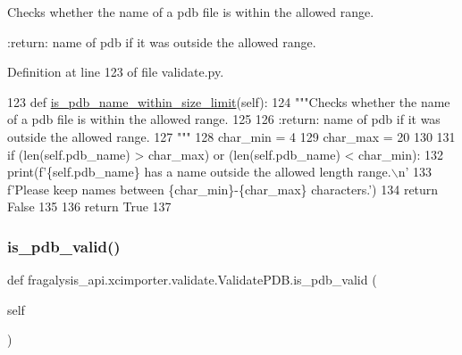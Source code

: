 \begin{DoxyVerb}Checks whether the name of a pdb file is within the allowed range.

:return: name of pdb if it was outside the allowed range.
\end{DoxyVerb}
 

Definition at line 123 of file validate.\+py.


\begin{DoxyCode}
123     \textcolor{keyword}{def }\hyperlink{classfragalysis__api_1_1xcimporter_1_1validate_1_1_validate_p_d_b_a23b89548ce5a6619636348c711b7b27e}{is\_pdb\_name\_within\_size\_limit}(self):
124         \textcolor{stringliteral}{"""Checks whether the name of a pdb file is within the allowed range.}
125 \textcolor{stringliteral}{}
126 \textcolor{stringliteral}{        :return: name of pdb if it was outside the allowed range.}
127 \textcolor{stringliteral}{        """}
128         char\_min = 4
129         char\_max = 20
130 
131         \textcolor{keywordflow}{if} (len(self.pdb\_name) > char\_max) \textcolor{keywordflow}{or} (len(self.pdb\_name) < char\_min):
132             print(f\textcolor{stringliteral}{'\{self.pdb\_name\} has a name outside the allowed length range.\(\backslash\)n'}
133                   f\textcolor{stringliteral}{'Please keep names between \{char\_min\}-\{char\_max\} characters.'})
134             \textcolor{keywordflow}{return} \textcolor{keyword}{False}
135 
136         \textcolor{keywordflow}{return} \textcolor{keyword}{True}
137 \end{DoxyCode}
\mbox{\label{classfragalysis__api_1_1xcimporter_1_1validate_1_1_validate_p_d_b_a7e6b2f1b0ea513e4485fabb411c5f3f5}} 
\subsubsection{\texorpdfstring{is\+\_\+pdb\+\_\+valid()}{is\_pdb\_valid()}}
{\footnotesize\ttfamily def fragalysis\+\_\+api.\+xcimporter.\+validate.\+Validate\+P\+D\+B.\+is\+\_\+pdb\+\_\+valid (\begin{DoxyParamCaption}\item[{}]{self }\end{DoxyParamCaption})}

